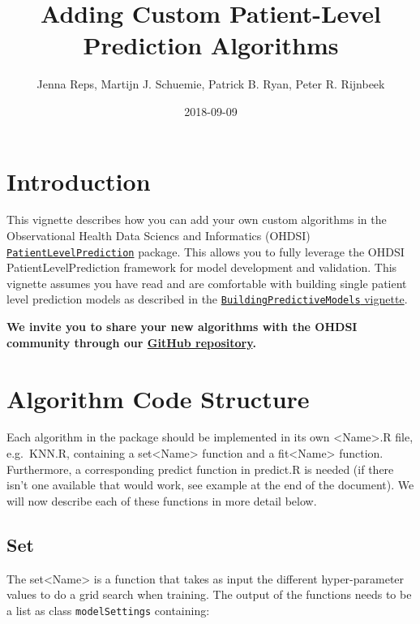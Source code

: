 \documentclass[]{article}
\title{Adding Custom Patient-Level Prediction Algorithms}
\author{Jenna Reps, Martijn J. Schuemie, Patrick B. Ryan, Peter R. Rijnbeek}
\date{2018-09-09}
\begin{document}
\maketitle

{
\setcounter{tocdepth}{2}
\tableofcontents
}
\section{Introduction}\label{introduction}

This vignette describes how you can add your own custom algorithms in
the Observational Health Data Sciencs and Informatics (OHDSI)
\href{http://github.com/OHDSI/PatientLevelPrediction}{\texttt{PatientLevelPrediction}}
package. This allows you to fully leverage the OHDSI
PatientLevelPrediction framework for model development and validation.
This vignette assumes you have read and are comfortable with building
single patient level prediction models as described in the
\href{https://github.com/OHDSI/PatientLevelPrediction/blob/master/inst/doc/BuildingPredictiveModels.pdf}{\texttt{BuildingPredictiveModels}
vignette}.

\textbf{We invite you to share your new algorithms with the OHDSI
community through our
\href{http://github.com/OHDSI/PatientLevelPrediction}{GitHub
repository}.}

\section{Algorithm Code Structure}\label{algorithm-code-structure}

Each algorithm in the package should be implemented in its own
\textless{}Name\textgreater{}.R file, e.g.~KNN.R, containing a
set\textless{}Name\textgreater{} function and a
fit\textless{}Name\textgreater{} function. Furthermore, a corresponding
predict function in predict.R is needed (if there isn't one available
that would work, see example at the end of the document). We will now
describe each of these functions in more detail below.

\subsection{Set}\label{set}

The set\textless{}Name\textgreater{} is a function that takes as input
the different hyper-parameter values to do a grid search when training.
The output of the functions needs to be a list as class
\texttt{modelSettings} containing:
\end{document}
